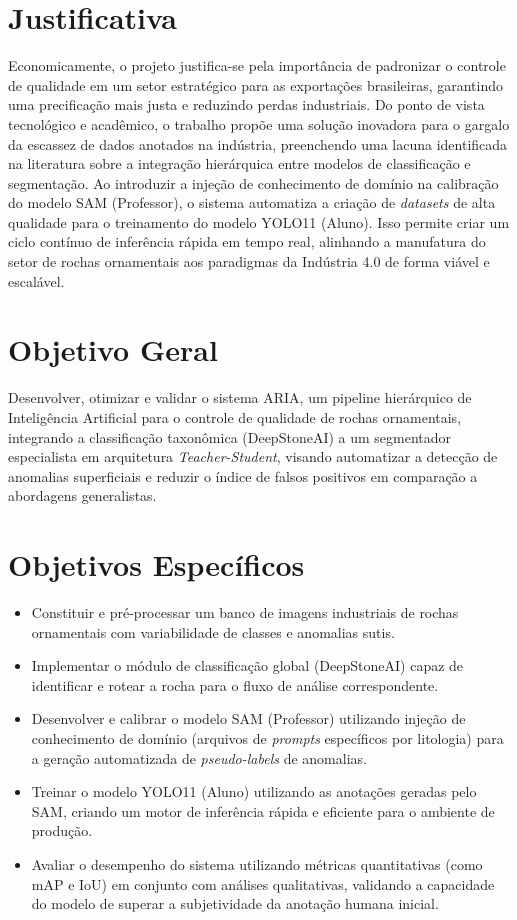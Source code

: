 \section{Justificativa}
Economicamente, o projeto justifica-se pela importância de padronizar o controle de qualidade em um setor estratégico para as exportações brasileiras, garantindo uma precificação mais justa e reduzindo perdas industriais. Do ponto de vista tecnológico e acadêmico, o trabalho propõe uma solução inovadora para o gargalo da escassez de dados anotados na indústria, preenchendo uma lacuna identificada na literatura sobre a integração hierárquica entre modelos de classificação e segmentação. Ao introduzir a injeção de conhecimento de domínio na calibração do modelo SAM (Professor), o sistema automatiza a criação de \textit{datasets} de alta qualidade para o treinamento do modelo YOLO11 (Aluno). Isso permite criar um ciclo contínuo de inferência rápida em tempo real, alinhando a manufatura do setor de rochas ornamentais aos paradigmas da Indústria 4.0 de forma viável e escalável.

\section{Objetivo Geral}
Desenvolver, otimizar e validar o sistema ARIA, um pipeline hierárquico de Inteligência Artificial para o controle de qualidade de rochas ornamentais, integrando a classificação taxonômica (DeepStoneAI) a um segmentador especialista em arquitetura \textit{Teacher-Student}, visando automatizar a detecção de anomalias superficiais e reduzir o índice de falsos positivos em comparação a abordagens generalistas.

\section{Objetivos Específicos}
\begin{itemize}
    \item Constituir e pré-processar um banco de imagens industriais de rochas ornamentais com variabilidade de classes e anomalias sutis.
    \item Implementar o módulo de classificação global (DeepStoneAI) capaz de identificar e rotear a rocha para o fluxo de análise correspondente.
    \item Desenvolver e calibrar o modelo SAM (Professor) utilizando injeção de conhecimento de domínio (arquivos de \textit{prompts} específicos por litologia) para a geração automatizada de \textit{pseudo-labels} de anomalias.
    \item Treinar o modelo YOLO11 (Aluno) utilizando as anotações geradas pelo SAM, criando um motor de inferência rápida e eficiente para o ambiente de produção.
    \item Avaliar o desempenho do sistema utilizando métricas quantitativas (como mAP e IoU) em conjunto com análises qualitativas, validando a capacidade do modelo de superar a subjetividade da anotação humana inicial.
\end{itemize}

